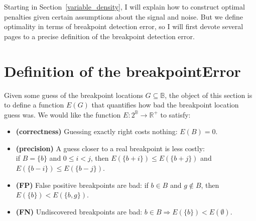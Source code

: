 \documentclass{jsfds} %
\newcommand{\RR}{\mathbb{R}}
\begin{document}


Starting in Section~\ref{variable_density}, I will explain how to
construct optimal penalties given certain assumptions about the signal
and noise. But we define optimality in terms of breakpoint detection
error, so I will first devote several pages to a precise definition of
the breakpoint detection error.

\section{Definition of the breakpointError}

Given some guess of the breakpoint locations $G\subseteq\mathbb B$,
the object of this section is to define a function ${E }(G)$
that quantifies how bad the breakpoint location guess was. We would
like the function ${E }: 2^{\mathbb B}\rightarrow \RR^+$ to
satisfy:

\begin{itemize}
\item \textbf{(correctness)} Guessing exactly right costs nothing: ${E }(B)=0$.
\item \textbf{(precision)} A guess closer to a real breakpoint is less
  costly:\\if $B=\{b\}$ and $0\leq i<j$, then
  ${E }(\{b+i\})\leq{E }(\{b+j\})$ and
  ${E }(\{b-i\})\leq{E }(\{b-j\})$.
\item \textbf{(FP)} False positive breakpoints are
  bad: if $b\in B$ and $g\not\in B$, then ${E }(\{b\}) <
  {E }(\{b,g\})$.
\item \textbf{(FN)} Undiscovered breakpoints are bad:
  $b\in B\Rightarrow{E }(\{b\}) < {E }(\emptyset)$.
\end{itemize}
\end{document}

